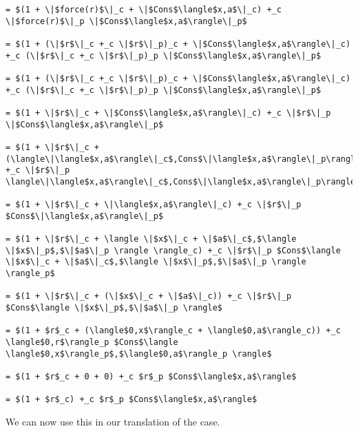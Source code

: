 \begin{lstlisting}
= $(1 + \|$force(r)$\|_c + \|$Cons$\langle$x,a$\|_c) +_c \|$force(r)$\|_p \|$Cons$\langle$x,a$\rangle\|_p$

= $(1 + (\|$r$\|_c +_c \|$r$\|_p)_c + \|$Cons$\langle$x,a$\rangle\|_c) +_c (\|$r$\|_c +_c \|$r$\|_p)_p \|$Cons$\langle$x,a$\rangle\|_p$

= $(1 + (\|$r$\|_c +_c \|$r$\|_p)_c + \|$Cons$\langle$x,a$\rangle\|_c) +_c (\|$r$\|_c +_c \|$r$\|_p)_p \|$Cons$\langle$x,a$\rangle\|_p$

= $(1 + \|$r$\|_c + \|$Cons$\langle$x,a$\rangle\|_c) +_c \|$r$\|_p \|$Cons$\langle$x,a$\rangle\|_p$

= $(1 + \|$r$\|_c + (\langle\|\langle$x,a$\rangle\|_c$,Cons$\|\langle$x,a$\rangle\|_p\rangle)_c) +_c \|$r$\|_p \langle\|\langle$x,a$\rangle\|_c$,Cons$\|\langle$x,a$\rangle\|_p\rangle_p$

= $(1 + \|$r$\|_c + \|\langle$x,a$\rangle\|_c) +_c \|$r$\|_p $Cons$\|\langle$x,a$\rangle\|_p$

= $(1 + \|$r$\|_c + \langle \|$x$\|_c + \|$a$\|_c$,$\langle \|$x$\|_p$,$\|$a$\|_p \rangle \rangle_c) +_c \|$r$\|_p $Cons$\langle \|$x$\|_c + \|$a$\|_c$,$\langle \|$x$\|_p$,$\|$a$\|_p \rangle \rangle_p$

= $(1 + \|$r$\|_c + (\|$x$\|_c + \|$a$\|_c)) +_c \|$r$\|_p $Cons$\langle \|$x$\|_p$,$\|$a$\|_p \rangle$

= $(1 + $r$_c + (\langle$0,x$\rangle_c + \langle$0,a$\rangle_c)) +_c \langle$0,r$\rangle_p $Cons$\langle \langle$0,x$\rangle_p$,$\langle$0,a$\rangle_p \rangle$

= $(1 + $r$_c + 0 + 0) +_c $r$_p $Cons$\langle$x,a$\rangle$

= $(1 + $r$_c) +_c $r$_p $Cons$\langle$x,a$\rangle$
\end{lstlisting}
%
We can now use this in our translation of the  case.
%
